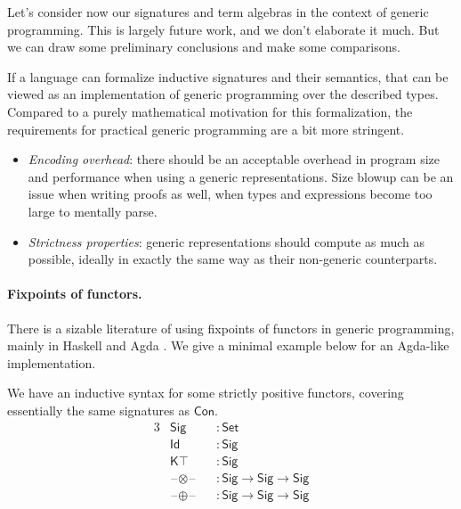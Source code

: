 \documentclass[12pt,a4paper,twoside,openany]{book}
\theoremstyle{remark}
\theoremstyle{definition}
\newcommand{\ms}[1]{\mathsf{#1}}
\newcommand{\Con}{\mathsf{Con}}
\newcommand{\blank}{\mathord{\hspace{1pt}\text{--}\hspace{1pt}}}
\newcommand{\Set}{\mathsf{Set}}
\begin{document}
Let's consider now our signatures and term algebras in the context of generic
programming. This is largely future work, and we don't elaborate it much. But we
can draw some preliminary conclusions and make some comparisons.

If a language can formalize inductive signatures and their semantics, that can
be viewed as an implementation of generic programming over the described types.
Compared to a purely mathematical motivation for this formalization, the
requirements for practical generic programming are a bit more stringent.
\begin{itemize}
  \item \emph{Encoding overhead}: there should be an acceptable overhead in
    program size and performance when using a generic representations.  Size
    blowup can be an issue when writing proofs as well, when types and
    expressions become too large to mentally parse.
  \item \emph{Strictness properties}: generic representations should compute as
    much as possible, ideally in exactly the same way as their non-generic
    counterparts.
\end{itemize}

\paragraph{Fixpoints of functors.}There is a sizable literature
of using fixpoints of functors in generic programming, mainly in Haskell
\cite{alacarte,compdata,multirec} and Agda \cite{loh11generic,allais20type}. We
give a minimal example below for an Agda-like implementation.

We have an inductive syntax for some strictly positive functors, covering essentially the
same signatures as $\Con$.
\begin{alignat*}{3}
  & \ms{Sig}                &&: \Set \\
  & \ms{Id}                 &&: \ms{Sig} \\
  & \ms{K\top}              &&: \ms{Sig} \\
  & \blank\!\otimes\!\blank &&: \ms{Sig} \to \ms{Sig} \to \ms{Sig} \\
  & \blank\!\oplus\!\blank  &&: \ms{Sig} \to \ms{Sig} \to \ms{Sig}
\end{alignat*}
\end{document}
